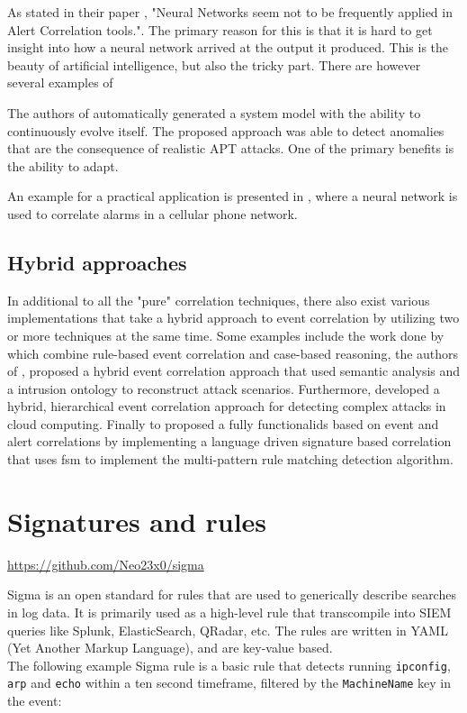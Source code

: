 As \textcite{pouget2003alert} stated in their paper , "Neural Networks seem not to be frequently applied in Alert Correlation tools.". The primary reason for this is that it is hard to get insight into how a neural network arrived at the output it produced. This is the beauty of artificial intelligence, but also the tricky part. There are however several examples of 

The authors of  \textcite{friedberg2015combating} automatically generated a system model with the ability to continuously evolve itself. The proposed approach was able to detect anomalies that are the consequence of realistic APT attacks.
One of the primary benefits is the ability to adapt.

An example for a practical application is presented in \textcite{wietgrefe1997using}, where a neural network is used to correlate alarms in a cellular phone network.


\subsection{Hybrid approaches}
In additional to all the "pure" correlation techniques, there also exist various implementations that take a hybrid approach to event correlation by utilizing two or more techniques at the same time.
Some examples include the work done by \textcite{hanemann_2008} which combine rule-based event correlation and case-based reasoning, the authors of , \textcite{saad2012extracting} proposed a hybrid event correlation approach that used semantic analysis and a intrusion ontology to reconstruct attack scenarios. Furthermore, \textcite{ficco2013security} developed a hybrid, hierarchical event correlation approach for detecting complex attacks in cloud computing. Finally \textcite{Ludovic_2004} to proposed a fully functional\acrshort{ids} based on event and alert correlations by implementing a language driven signature based correlation that uses \acrshort{fsm} to implement the multi-pattern rule matching detection algorithm.

\section{Signatures and rules}
\url{https://github.com/Neo23x0/sigma}

Sigma is an open standard for rules that are used to generically describe searches in log data. It is primarily used as a high-level rule that transcompile into SIEM queries like Splunk, ElasticSearch, QRadar, etc. The rules are written in YAML (Yet Another Markup Language), and are key-value based.
\\
The following example Sigma rule is a basic rule that detects running \lstinline{ipconfig}, \lstinline{arp} and \lstinline{echo} within a ten second timeframe, filtered by the \lstinline{MachineName} key in the event: 

